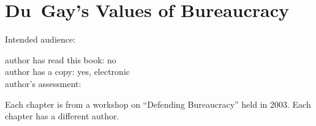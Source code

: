 \section{Du~Gay's Values of Bureaucracy\label{review:dugay_values}}

\cite{2005_DuGay}

Intended audience:

author has read this book: no\\
author has a copy: yes, electronic\\
author's assessment:


Each chapter is from a workshop on ``Defending
Bureaucracy'' held in 2003. Each chapter has a different author. 